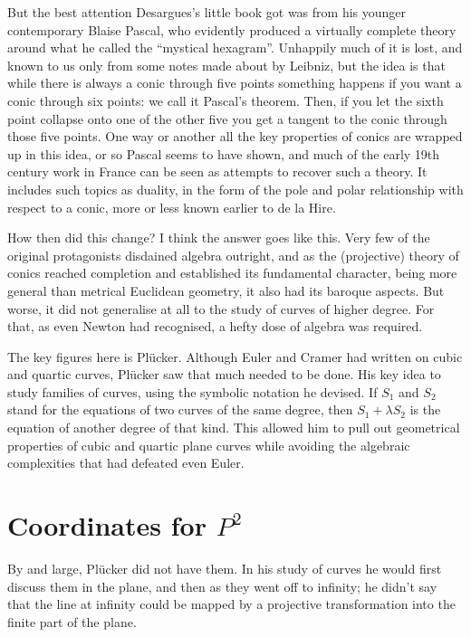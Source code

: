 \documentclass[11pt]{book}
\begin{document}
But the best attention Desargues's little book got was from his younger contemporary Blaise Pascal, who evidently produced a virtually complete theory around what he called the ``mystical hexagram''. Unhappily much of it is lost, and known to us only from some notes made about by Leibniz, but the idea is that while there is always a conic through five points something happens if you want a conic through six points: we call it Pascal's theorem. Then, if you let the sixth point collapse onto one of the other five you get a tangent to the conic through those five points. One way or another all the key properties of conics are wrapped up in this idea, or so Pascal seems to have shown, and much of the early 19th century work in France can be seen as attempts to recover such a theory. It includes such topics as duality, in the form of the pole and polar relationship with respect to a conic, more or less known earlier to de la Hire.

How then did this change? I think the answer goes like this. Very few of the original protagonists disdained algebra outright, and as the (projective) theory of conics reached completion and established its fundamental character, being more general than metrical Euclidean geometry, it also had its baroque aspects. But worse, it did not generalise at all to the study of curves of higher degree. For that, as even Newton had recognised, a hefty dose of algebra was required.

The key figures here is Pl\"ucker. Although Euler and Cramer had written on cubic and quartic curves, Pl\"ucker saw that much needed to be done. His key idea to study families of curves, using the symbolic notation he devised. If $S_1$ and $S_2$ stand for the equations of two curves of the same degree, then $S_1 + \lambda S_2$ is the equation of another degree of that kind. This allowed him to pull out geometrical properties of cubic and quartic plane curves while avoiding the algebraic complexities that had defeated even Euler.


\section{Coordinates for $P^2$}
By and large, Pl\"ucker did not have them. In his study of curves he would first discuss them in  the plane, and then as they went off to infinity; he didn't say that the line at infinity could be mapped by a projective transformation into the finite part of the plane. 
\end{document}
